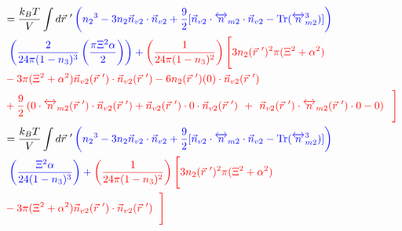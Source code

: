\documentclass[double,12pt]{revtex4-2}
\begin{document}
\begin{align} %
%
&=\frac{k_BT}{V}\int d\vec r~' \color{blue}\left( {n_2}^3-3n_2
    \vec{n}_{v2}\cdot\vec{n}_{v2} 
     +\frac{9}{2}[\vec{n}_{v2}\cdot{\overleftrightarrow{n}_{m2}}\cdot{
     \vec{n}_{v2}}-\operatorname{Tr}({\overleftrightarrow{n}^3_{m2}})]
     \right) \nonumber\\
     & \color{blue}~\left(\frac{2}{24\pi(1-n_3)^3}\left(\frac{\pi\Xi^2\alpha}{2}\right)
     \right) +\color{red} \left(\frac{1}{24\pi(1-n_3)^2}\right)\Bigg[3n_2(\vec r~')^2
     \pi(\Xi^2 + \alpha^2) \color{white}\Bigg] \nonumber\\
     &\color{red}- 3\pi(\Xi^2 + \alpha^2)\vec n_{v2}(\vec r~') \cdot \vec n_{v2}
     (\vec r~') -6n_2(\vec r~')(0)\cdot \vec n_{v2}(\vec r~')\nonumber \\
     &\color{red}+\frac{9}{2}\left(0\cdot \overleftrightarrow n_{m2}(\vec r~')\cdot 
     \vec n_{v2}( \vec r~')+\vec n_{v2}(\vec r~')\cdot 0 \cdot \vec n_{v2}
     (\vec r~')\color{white}\right)+ \color{white}\left(\color{black}\color{red}
     \vec n_{v2}(\vec r~')\cdot\overleftrightarrow n_{m2}(\vec r~')
     \cdot 0-0\right) 
     \color{white}\Bigg[\color{black}\color{red}\Bigg] \\
%
&=\frac{k_BT}{V}\int d\vec r~' \color{blue}\left({n_2}^3-3n_2
   \vec{n}_{v2}\cdot\vec{n}_{v2} 
    +\frac{9}{2}[\vec{n}_{v2}\cdot{\overleftrightarrow{n}_{m2}}\cdot{
    \vec{n}_{v2}}-\operatorname{Tr}({\overleftrightarrow{n}^3_{m2}})]
    \right) \nonumber\\
    &\color{blue}~\left(\frac{\Xi^2\alpha}{24(1-n_3)^3}
    \right) + \color{black}\color{red}\left(\frac{1}{24\pi(1-n_3)^2}\right)\Bigg[\color{white}
    \color{red}3n_2(\vec r~')^2
    \pi(\Xi^2 + \alpha^2) \color{white}\Bigg] \\
    &\color{red}- 3\pi(\Xi^2 + \alpha^2)\vec n_{v2}
    (\vec r~') \cdot \vec n_{v2}(\vec r~')
    \color{white}\Bigg[\color{black}\color{red}\Bigg]
\end{align}
\end{document}
